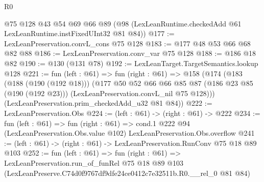 \begin{lexlean}{R0}
\begin{coremodule}
    @75
    @128
    @43
    @54
    @69
    @66
    @89
    (@98 (LexLeanRuntime.checkedAdd @61 LexLeanRuntime.instFixedUInt32 @81 @84))
@177 := LexLeanPreservation.convL_cons @75 @128
@183 := @177 @48 @53 @66 @68 @82 @88
@186 := LexLeanPreservation.conv_var @75 @128
@188 := @186 @18 @82
@190 := @130 (@131 @78)
@192 := LexLeanTarget.TargetSemantics.lookup @128
@221 := fun (left : @61) =>
  fun (right : @61) =>
  @158
    (@174
      (@183
        (@188 (@190 (@192 @18)))
        (@177
          @50
          @52
          @66
          @66
          @85
          @87
          (@186 @23 @85 (@190 (@192 @23)))
          (LexLeanPreservation.convL_nil @75 @128)))
      (LexLeanPreservation.prim_checkedAdd_u32 @81 @84))
@222 := LexLeanPreservation.Obs
@224 := (left : @61) -> (right : @61) -> @222
@234 := fun (left : @61) =>
  fun (right : @61) =>
  cond.{1} @222 @94 (LexLeanPreservation.Obs.value @102) LexLeanPreservation.Obs.overflow
@241 := (left : @61) -> (right : @61) -> LexLeanPreservation.RunConv @75 @18 @89 @103
@252 := fun (left : @61) =>
  fun (right : @61) =>
  LexLeanPreservation.run_of_funRel
    @75
    @18
    @89
    @103
    (LexLeanPreserve.C74d0f9767df9dfe24ce0412c7e32511b.R0.__rel_0 @81 @84)
\end{coremodule}
\end{lexlean}
